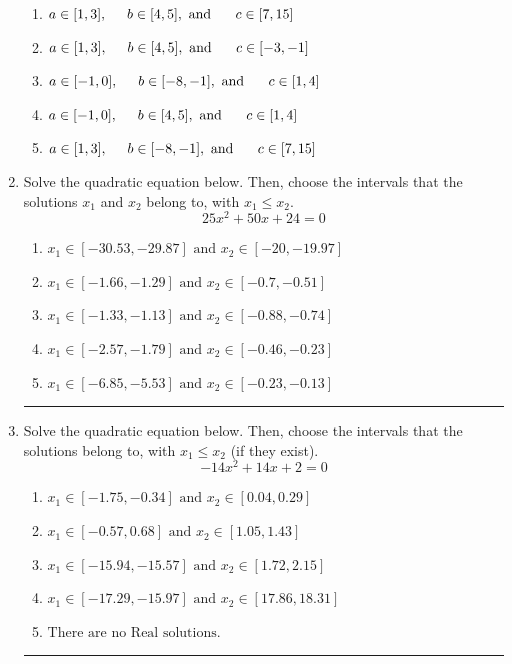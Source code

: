 \documentclass[14pt]{extbook}
\newcommand{\litem}[1]{\item#1\hspace*{-1cm}\rule{\textwidth}{0.4pt}}
\begin{document}
\begin{enumerate}
{\begin{center}
\end{center}
\begin{enumerate}[label=\Alph*.]
\item \( a \in [1, 3], \hspace*{5mm} b \in [4, 5], \text{ and } \hspace*{5mm} c \in [7, 15] \)
\item \( a \in [1, 3], \hspace*{5mm} b \in [4, 5], \text{ and } \hspace*{5mm} c \in [-3, -1] \)
\item \( a \in [-1, 0], \hspace*{5mm} b \in [-8, -1], \text{ and } \hspace*{5mm} c \in [1, 4] \)
\item \( a \in [-1, 0], \hspace*{5mm} b \in [4, 5], \text{ and } \hspace*{5mm} c \in [1, 4] \)
\item \( a \in [1, 3], \hspace*{5mm} b \in [-8, -1], \text{ and } \hspace*{5mm} c \in [7, 15] \)

\end{enumerate} }
\litem{
Solve the quadratic equation below. Then, choose the intervals that the solutions $x_1$ and $x_2$ belong to, with $x_1 \leq x_2$.\[ 25x^{2} +50 x + 24 = 0 \]\begin{enumerate}[label=\Alph*.]
\item \( x_1 \in [-30.53, -29.87] \text{ and } x_2 \in [-20, -19.97] \)
\item \( x_1 \in [-1.66, -1.29] \text{ and } x_2 \in [-0.7, -0.51] \)
\item \( x_1 \in [-1.33, -1.13] \text{ and } x_2 \in [-0.88, -0.74] \)
\item \( x_1 \in [-2.57, -1.79] \text{ and } x_2 \in [-0.46, -0.23] \)
\item \( x_1 \in [-6.85, -5.53] \text{ and } x_2 \in [-0.23, -0.13] \)

\end{enumerate} }
\litem{
Solve the quadratic equation below. Then, choose the intervals that the solutions belong to, with $x_1 \leq x_2$ (if they exist).\[ -14x^{2} +14 x + 2 = 0 \]\begin{enumerate}[label=\Alph*.]
\item \( x_1 \in [-1.75, -0.34] \text{ and } x_2 \in [0.04, 0.29] \)
\item \( x_1 \in [-0.57, 0.68] \text{ and } x_2 \in [1.05, 1.43] \)
\item \( x_1 \in [-15.94, -15.57] \text{ and } x_2 \in [1.72, 2.15] \)
\item \( x_1 \in [-17.29, -15.97] \text{ and } x_2 \in [17.86, 18.31] \)
\item \( \text{There are no Real solutions.} \)


\end{enumerate}}
\end{enumerate}
\end{document}
